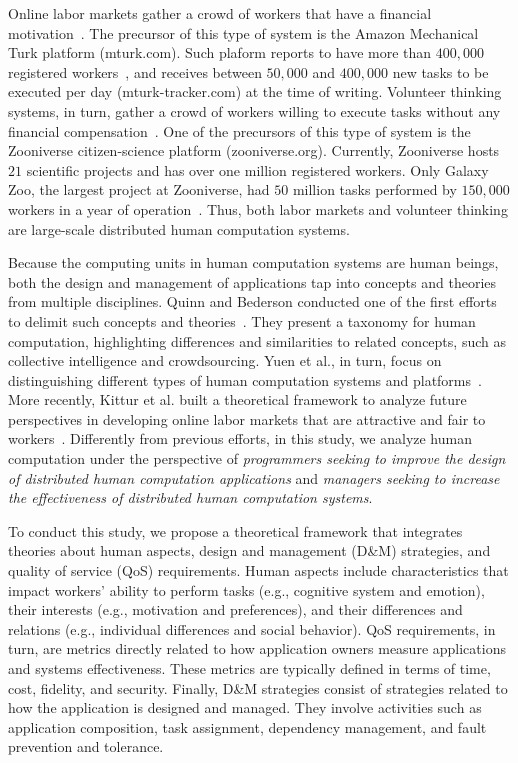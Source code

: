 \documentclass[11pt]{bmc_article_s50}
\begin{document}
Online labor markets gather a crowd of workers that have a financial motivation~\cite{Ipeirotis:2010}. The precursor of this type of system is the Amazon Mechanical Turk platform (mturk.com). Such plaform reports to have more than $400,000$ registered workers~\cite{Ross:2010}, and receives between $50,000$ and $400,000$ new tasks to be executed per day (mturk-tracker.com) at the time of writing. Volunteer thinking systems, in turn, gather a crowd of workers willing to execute tasks without any financial compensation~\cite{Ponciano:CiSE:2014}. One of the precursors of this type of system is the Zooniverse citizen-science platform (zooniverse.org). Currently, Zooniverse hosts $21$ scientific projects and has over one million registered workers. Only Galaxy Zoo, the largest project at Zooniverse, had $50$ million tasks performed by $150,000$ workers in a year of operation~\cite{ball:2013}. Thus, both labor markets and volunteer thinking are large-scale distributed human computation systems.

Because the computing units in human computation systems are human beings, both the design and management of applications tap into concepts and theories from multiple disciplines. Quinn and Bederson conducted one of the first efforts to delimit such concepts and theories~\cite{Quinn2011,Quinn2009}. They present a taxonomy for human computation, highlighting differences and similarities to related concepts, such as collective intelligence and crowdsourcing. Yuen et al., in turn, focus on distinguishing different types of human computation systems and platforms~\cite{Yuen:2009,King2011}. More recently, Kittur et al. built a theoretical framework to analyze future perspectives in developing online labor markets that are attractive and fair to workers~\cite{Kittur:cscw:2013}. Differently from previous efforts, in this study, we analyze human computation under the perspective of \textit{programmers seeking to improve the design of distributed human computation applications} and \textit{managers seeking to increase the effectiveness of distributed human computation systems}.

To conduct this study, we propose a theoretical framework that integrates theories about human aspects, design and management (D\&M) strategies, and quality of service (QoS) requirements. Human aspects include characteristics that impact workers' ability to perform tasks (e.g., cognitive system and emotion), their interests (e.g., motivation and preferences), and their differences and relations (e.g., individual differences and social behavior). QoS requirements, in turn, are metrics directly related to how application owners measure applications and systems effectiveness. These metrics are typically defined in terms of time, cost, fidelity, and security. Finally, D\&M strategies consist of strategies related to how the application is designed and managed. They involve activities such as application composition, task assignment, dependency management, and fault prevention and tolerance.
\end{document}
